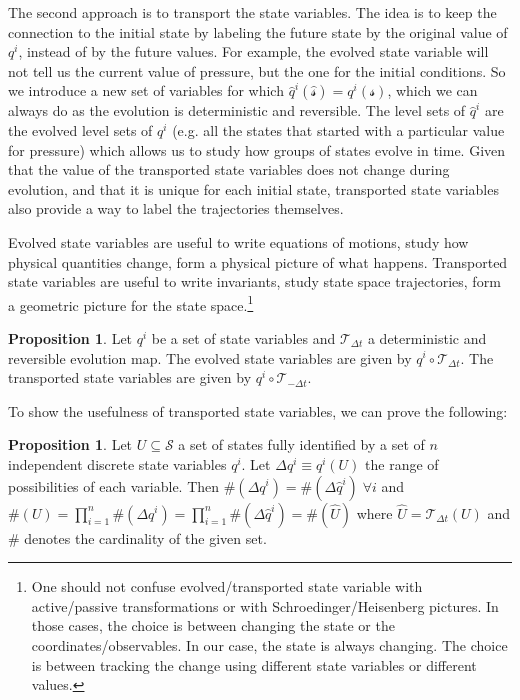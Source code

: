 \documentclass[aps,pra,10pt,twocolumn,floatfix,nofootinbib]{revtex4-1}
\numberwithin{equation}{section}
\theoremstyle{definition}
\newtheorem{prop}[equation]{Proposition}
\begin{document}
The second approach is to transport the state variables. The idea is to keep the connection to the initial state by labeling the future state by the original value of $q^i$, instead of by the future values. For example, the evolved state variable will not tell us the current value of pressure, but the one for the initial conditions. So we introduce a new set of variables for which $\hat{q}^i(\hat{\mathcal{s}})=q^i(\mathcal{s})$, which we can always do as the evolution is deterministic and reversible. The level sets of $\hat{q}^i$ are the evolved level sets of $q^i$ (e.g. all the states that started with a particular value for pressure) which allows us to study how groups of states evolve in time. Given that the value of the transported state variables does not change during evolution, and that it is unique for each initial state, transported state variables also provide a way to label the trajectories themselves.

Evolved state variables are useful to write equations of motions, study how physical quantities change, form a physical picture of what happens. Transported state variables are useful to write invariants, study state space trajectories, form a geometric picture for the state space.\footnote{One should not confuse evolved/transported state variable with active/passive transformations or with Schroedinger/Heisenberg pictures. In those cases, the choice is between changing the state or the coordinates/observables. In our case, the state is always changing. The choice is between tracking the change using different state variables or different values.}

\begin{prop}\label{evolved_transported_variable}
Let $q^i$ be a set of state variables and $\mathcal{T}_{\Delta t}$ a deterministic and reversible evolution map. The evolved state variables are given by $q^i \circ \mathcal{T}_{\Delta t}$. The transported state variables are given by $q^i \circ \mathcal{T}_{-\Delta t}$.
\end{prop}

To show the usefulness of transported state variables, we can prove the following:

\begin{prop}\label{discrete_state_metric}
	Let $U \subseteq \mathcal{S}$ a set of states fully identified by a set of $n$ independent discrete state variables $q^i$. Let $\Delta q^i \equiv q^i(U)$ the range of possibilities of each variable. Then $\#(\Delta q^i)=\#(\Delta \hat{q}^i) \; \forall i$ and $\#(U)=\prod\limits_{i=1}^{n}\#(\Delta q^i)=\prod\limits_{i=1}^{n}\#(\Delta \hat{q}^i)=\#(\hat{U})$ where $\hat{U}=\mathcal{T}_{\Delta t}(U)$ and $\#$ denotes the cardinality of the given set.
\end{prop}
\end{document}
